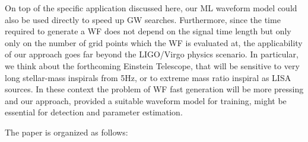 On top of the specific application discussed here, our ML waveform model could also be used directly 
to speed up GW searches. Furthermore, since the time required to generate a WF does not depend
on the signal time length but only only on the number of grid points which the WF is evaluated at,
the applicability of our approach goes far beyond the LIGO/Virgo physics scenario. In particular,
we think about the forthcoming Einstein Telescope, that will be sensitive to very long stellar-mass 
inspirals from 5Hz, or to extreme mass ratio inspiral as LISA sources. In these context the problem
of WF fast generation will be more pressing and our approach, provided a suitable waveform model 
for training,  might be essential for detection and parameter estimation. 

The paper is organized as follows: 

